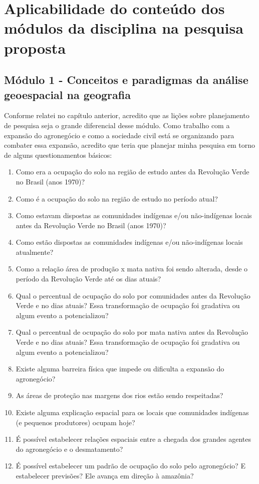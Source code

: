 \section{Aplicabilidade do conteúdo dos módulos da disciplina na pesquisa proposta}

\subsection{Módulo 1 - Conceitos e paradigmas da análise geoespacial na geografia}

Conforme relatei no capítulo anterior, acredito que as lições sobre planejamento de pesquisa seja o grande diferencial desse módulo. Como trabalho com a expansão do agronegócio e como a sociedade civil está se organizando para combater essa expansão, acredito que teria que planejar minha pesquisa em torno de alguns questionamentos básicos:

\begin{enumerate}
  \item Como era a ocupação do solo na região de estudo antes da Revolução Verde no Brasil (anos 1970)?
  \item Como é a ocupação do solo na região de estudo no período atual?
  \item Como estavam dispostas as comunidades indígenas e/ou não-indígenas locais antes da Revolução Verde no Brasil (anos 1970)?
  \item Como estão dispostas as comunidades indígenas e/ou não-indígenas locais atualmente?
  \item Como a relação área de produção x mata nativa foi sendo alterada, desde o período da Revolução Verde até os dias atuais?
  \item Qual o percentual de ocupação do solo por comunidades antes da Revolução Verde e no dias atuais? Essa transformação de ocupação foi gradativa ou algum evento a potencializou?
  \item Qual o percentual de ocupação do solo por mata nativa antes da Revolução Verde e no dias atuais? Essa transformação de ocupação foi gradativa ou algum evento a potencializou?
  \item Existe alguma barreira física que impede ou dificulta a expansão do agronegócio?
  \item As áreas de proteção nas margens dos rios estão sendo respeitadas?
  \item Existe alguma explicação espacial para os locais que comunidades indígenas (e pequenos produtores) ocupam hoje?
  \item É possível estabelecer relações espaciais entre a chegada dos grandes agentes do agronegócio e o desmatamento?
  \item É possível estabelecer um padrão de ocupação do solo pelo agronegócio? E estabelecer previsões? Ele avança em direção à amazônia?
\end{enumerate}

